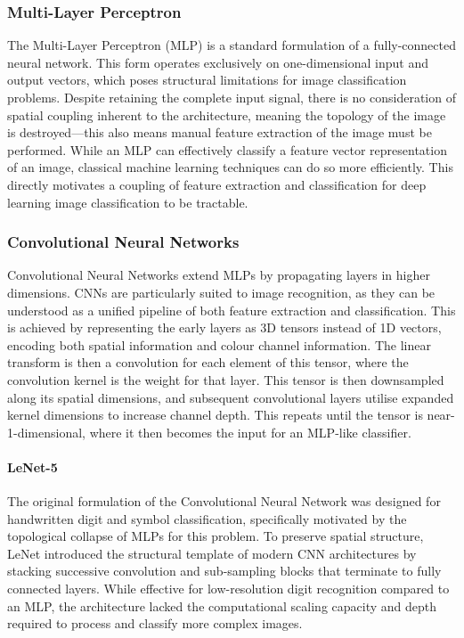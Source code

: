 \documentclass[10pt, a4paper]{article}
\begin{document}
\subsubsection{Multi-Layer Perceptron}
The Multi-Layer Perceptron (MLP) is a standard formulation of a fully-connected neural network. This form operates exclusively on one-dimensional input and output vectors, which poses structural limitations for image classification problems. Despite retaining the complete input signal, there is no consideration of spatial coupling inherent to the architecture, meaning the topology of the image is destroyed---this also means manual feature extraction of the image must be performed. While an MLP can effectively classify a feature vector representation of an image, classical machine learning techniques can do so more efficiently. This directly motivates a coupling of feature extraction and classification for deep learning image classification to be tractable.

\subsubsection{Convolutional Neural Networks}
Convolutional Neural Networks extend MLPs by propagating layers in higher dimensions. CNNs are particularly suited to image recognition, as they can be understood as a unified pipeline of both feature extraction and classification. This is achieved by representing the early layers as 3D tensors instead of 1D vectors, encoding both spatial information and colour channel information. The linear transform is then a convolution for each element of this tensor, where the convolution kernel is the weight for that layer. This tensor is then downsampled along its spatial dimensions, and subsequent convolutional layers utilise expanded kernel dimensions to increase channel depth. This repeats until the tensor is near-1-dimensional, where it then becomes the input for an MLP-like classifier\cite{lecun_gradient-based_1998}.

\paragraph{LeNet-5} The original formulation of the Convolutional Neural Network was designed for handwritten digit and symbol classification, specifically motivated by the topological collapse of MLPs for this problem\cite{lecun_gradient-based_1998}. To preserve spatial structure, LeNet introduced the structural template of modern CNN architectures by stacking successive convolution and sub-sampling blocks that terminate to fully connected layers. While effective for low-resolution digit recognition compared to an MLP, the architecture lacked the computational scaling capacity and depth required to process and classify more complex images.
\end{document}
